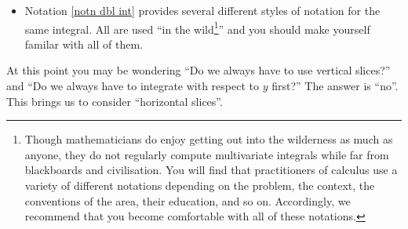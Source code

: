 \begin{itemize}
\begin{itemize}
\end{itemize}

\item
Notation \ref{notn dbl int} provides several different styles of notation 
for the same integral. All are used ``in the wild\footnote{Though mathematicians 
do enjoy getting out into the wilderness as much as anyone, they do not regularly compute multivariate integrals while far from blackboards and civilisation. You will find that practitioners of calculus use a variety of different notations depending on the problem, the context, the conventions of the area, their education, and so on. Accordingly, we recommend that you become comfortable with all of these notations.}'' 
and you should make yourself familar with all of them.


\end{itemize}

At this point you may be wondering ``Do we always have to use vertical 
slices?'' and ``Do we always have to integrate with respect to $y$ first?''
The answer is ``no''. This brings us to consider ``horizontal slices''.

